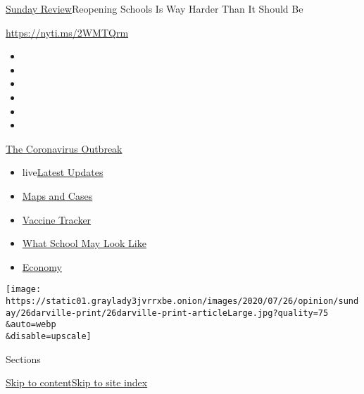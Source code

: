 \href{/section/opinion/sunday}{Sunday Review}\textbar{}Reopening Schools
Is Way Harder Than It Should Be

\url{https://nyti.ms/2WMTQrm}

\begin{itemize}
\item
\item
\item
\item
\item
\item
\end{itemize}

\href{https://www.nytimes3xbfgragh.onion/news-event/coronavirus?action=click\&pgtype=Article\&state=default\&region=TOP_BANNER\&context=storylines_menu}{The
Coronavirus Outbreak}

\begin{itemize}
\tightlist
\item
  live\href{https://www.nytimes3xbfgragh.onion/2020/08/01/world/coronavirus-covid-19.html?action=click\&pgtype=Article\&state=default\&region=TOP_BANNER\&context=storylines_menu}{Latest
  Updates}
\item
  \href{https://www.nytimes3xbfgragh.onion/interactive/2020/us/coronavirus-us-cases.html?action=click\&pgtype=Article\&state=default\&region=TOP_BANNER\&context=storylines_menu}{Maps
  and Cases}
\item
  \href{https://www.nytimes3xbfgragh.onion/interactive/2020/science/coronavirus-vaccine-tracker.html?action=click\&pgtype=Article\&state=default\&region=TOP_BANNER\&context=storylines_menu}{Vaccine
  Tracker}
\item
  \href{https://www.nytimes3xbfgragh.onion/interactive/2020/07/29/us/schools-reopening-coronavirus.html?action=click\&pgtype=Article\&state=default\&region=TOP_BANNER\&context=storylines_menu}{What
  School May Look Like}
\item
  \href{https://www.nytimes3xbfgragh.onion/live/2020/07/31/business/stock-market-today-coronavirus?action=click\&pgtype=Article\&state=default\&region=TOP_BANNER\&context=storylines_menu}{Economy}
\end{itemize}

\texttt{[image: https://static01.graylady3jvrrxbe.onion/images/2020/07/26/opinion/sunday/26darville-print/26darville-print-articleLarge.jpg?quality=75\\\&auto=webp\\\&disable=upscale]}

Sections

\protect\hyperlink{site-content}{Skip to
content}\protect\hyperlink{site-index}{Skip to site index}

